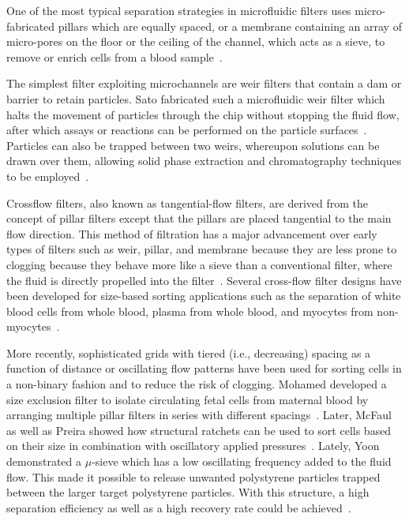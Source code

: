 One of the most typical separation strategies in microfluidic filters uses micro-fabricated pillars which are equally spaced, or a membrane containing an array of micro-pores on the floor or the ceiling of the channel, which acts as a sieve, to remove or enrich cells from a blood sample~\cite{Zheng2011,Lim2012,Lv2013,Fan2015}.

The simplest filter exploiting microchannels are weir filters that contain a dam or barrier to retain particles. Sato \etal{} fabricated such a microfluidic weir filter which halts the movement of particles through the chip without stopping the fluid flow, after which assays or reactions can be performed on the particle surfaces~\cite{Sato2000}. Particles can also be trapped between two weirs, whereupon solutions can be drawn over them, allowing solid phase extraction and chromatography techniques to be employed~\cite{Oleschuk2000}. 

Crossflow filters, also known as tangential-flow filters, are derived from the concept of pillar filters except that the pillars are placed tangential to the main flow direction. This method of filtration has a major advancement over early types of filters such as weir, pillar, and membrane because they are less prone to clogging because they behave more like a sieve than a conventional filter, where the fluid is directly propelled into the filter~\cite{Murthy2006}. Several cross-flow filter designs have been developed for size-based sorting applications such as the separation of white blood cells from whole blood, plasma from whole blood, and myocytes from non-myocytes~\cite{Sethu2006,VanDelinder2007}.

More recently, sophisticated grids with tiered (i.e., decreasing) spacing as a function of distance or oscillating flow patterns have been used for sorting cells in a non-binary fashion and to reduce the risk of clogging. Mohamed \etal{} developed a size exclusion filter to isolate circulating fetal cells from maternal blood by arranging multiple pillar filters in series with different spacings~\cite{Mohamed2007}. Later, McFaul \etal{} as well as Preira \etal{} showed how structural ratchets can be used to sort cells based on their size in combination with oscillatory applied pressures~\cite{McFaul2012,Preira2013}. Lately, Yoon \etal{} demonstrated a $\mu$-sieve which has a low oscillating frequency added to the fluid flow. This made it possible to release unwanted polystyrene particles trapped between the larger target polystyrene particles. With this structure, a high separation efficiency as well as a high recovery rate could be achieved~\cite{Yoon2016}.

